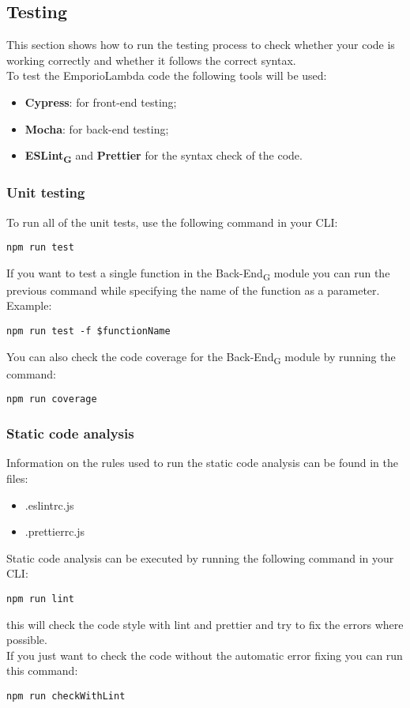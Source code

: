 \subsection{Testing}
This section shows how to run the testing process to check whether your code is working correctly and whether it follows the correct syntax. \\ 
To test the EmporioLambda code the following tools will be used:
\begin{itemize}
\item \textbf{Cypress}: for front-end testing;
\item \textbf{Mocha}: for back-end testing;
\item \textbf{ESLint\textsubscript{G}} and \textbf{Prettier} for the syntax check of the code.
\end{itemize}

\subsubsection{Unit testing}
To run all of the unit tests, use the following command in your CLI:
\begin{center}
\texttt{npm run test}
\end{center}
If you want to test a single function in the Back-End\textsubscript{G} module you can run the previous command while specifying the name of the function as a parameter.\\
Example:
\begin{center}
\texttt{npm run test -f \$functionName}
\end{center}
You can also check the code coverage for the Back-End\textsubscript{G} module by running the command:
\begin{center}
\texttt{npm run coverage}
\end{center}

\subsubsection{Static code analysis}
Information on the rules used to run the static code analysis can be found in the files:
\begin{itemize}
\item .eslintrc.js
\item .prettierrc.js
\end{itemize}
Static code analysis can be executed by running the following command in your CLI:
\begin{center}
\texttt{npm run lint}
\end{center}
this will check the code style with lint and prettier and try to fix the errors where possible.\\ 
If you just want to check the code without the automatic error fixing you can run this command:
\begin{center}
\texttt{npm run checkWithLint}
\end{center}
